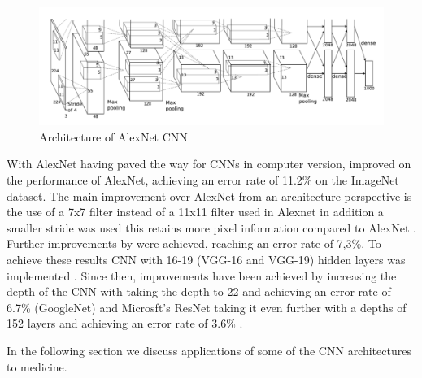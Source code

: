 \documentclass[a4paper,11pt]{article}
\begin{document}
\begin{figure}[!htbp]
\includegraphics[scale=0.3]{AlexNetArchitecture.png} 
\caption{Architecture of AlexNet CNN \citep{NIPS2012_c399862d} }
\label{fig: AlexNet}
\end{figure}

With AlexNet having paved the way for CNNs in computer version,  \cite{ZFNET} improved on the performance of AlexNet, achieving an error rate of 11.2\% on the ImageNet dataset. The main improvement over AlexNet from an architecture perspective is the use of a 7x7 filter instead of a 11x11 filter used in Alexnet in addition a smaller stride was used this retains more pixel information compared to AlexNet \citep{ZFNET}. Further improvements by \cite{simonyan2015deep} were achieved, reaching an error rate of 7,3\%. To achieve these results CNN with 16-19 (VGG-16 and VGG-19) hidden layers was implemented \citep{simonyan2015deep}. Since then, improvements have been achieved by increasing the depth of the CNN with \cite{googleNet} taking the depth to 22 and achieving an error rate of 6.7\% (GoogleNet) and Microsft's ResNet taking it even further with a depths of 152 layers and achieving an error rate of 3.6\% \citep{microsoft}.

In the following section we discuss applications of some of the CNN architectures to medicine.
\end{document}
